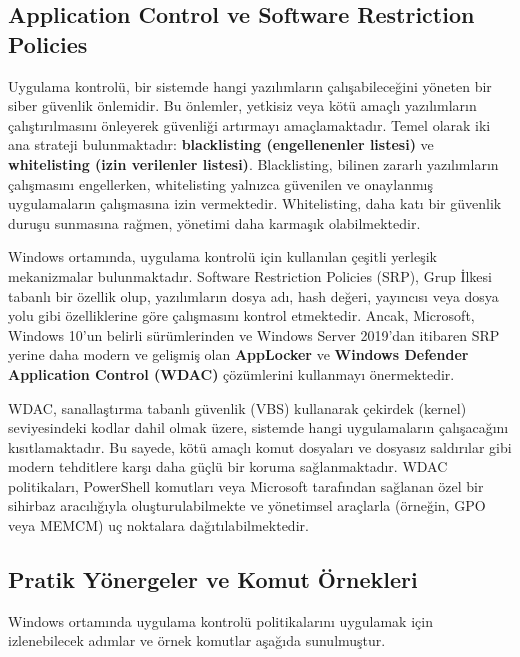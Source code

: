 \subsection{Application Control ve Software Restriction Policies}

Uygulama kontrolü, bir sistemde hangi yazılımların çalışabileceğini yöneten bir siber güvenlik önlemidir. Bu önlemler, yetkisiz veya kötü amaçlı yazılımların çalıştırılmasını önleyerek güvenliği artırmayı amaçlamaktadır. Temel olarak iki ana strateji bulunmaktadır: \textbf{blacklisting (engellenenler listesi)} ve \textbf{whitelisting (izin verilenler listesi)}. Blacklisting, bilinen zararlı yazılımların çalışmasını engellerken, whitelisting yalnızca güvenilen ve onaylanmış uygulamaların çalışmasına izin vermektedir. Whitelisting, daha katı bir güvenlik duruşu sunmasına rağmen, yönetimi daha karmaşık olabilmektedir.

Windows ortamında, uygulama kontrolü için kullanılan çeşitli yerleşik mekanizmalar bulunmaktadır. Software Restriction Policies (SRP), Grup İlkesi tabanlı bir özellik olup, yazılımların dosya adı, hash değeri, yayıncısı veya dosya yolu gibi özelliklerine göre çalışmasını kontrol etmektedir. Ancak, Microsoft, Windows 10'un belirli sürümlerinden ve Windows Server 2019'dan itibaren SRP yerine daha modern ve gelişmiş olan \textbf{AppLocker} ve \textbf{Windows Defender Application Control (WDAC)} çözümlerini kullanmayı önermektedir.

WDAC, sanallaştırma tabanlı güvenlik (VBS) kullanarak çekirdek (kernel) seviyesindeki kodlar dahil olmak üzere, sistemde hangi uygulamaların çalışacağını kısıtlamaktadır. Bu sayede, kötü amaçlı komut dosyaları ve dosyasız saldırılar gibi modern tehditlere karşı daha güçlü bir koruma sağlanmaktadır. WDAC politikaları, PowerShell komutları veya Microsoft tarafından sağlanan özel bir sihirbaz aracılığıyla oluşturulabilmekte ve yönetimsel araçlarla (örneğin, GPO veya MEMCM) uç noktalara dağıtılabilmektedir.

\subsection{Pratik Yönergeler ve Komut Örnekleri}

Windows ortamında uygulama kontrolü politikalarını uygulamak için izlenebilecek adımlar ve örnek komutlar aşağıda sunulmuştur.

